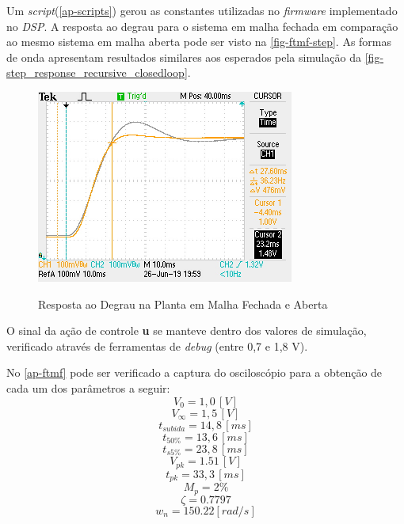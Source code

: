 \documentclass[
	12pt,				%
	article,			%
	openright,			%
	oneside,
	a4paper,			%
	chapter=TITLE,		%
	section=TITLE,		%
	english,			%
	french,				%
	spanish,			%
	brazil,				%
]{abntex2}
\begin{document}
                Um \textit{script}(\autoref{ap-scripts}) gerou as constantes utilizadas no \textit{firmware} implementado no \textit{DSP}. A resposta ao degrau para o sistema em malha fechada em comparação ao mesmo sistema em malha aberta pode ser visto na \autoref{fig-ftmf-step}.
                As formas de onda apresentam resultados similares aos esperados pela simulação da \autoref{fig-step_response_recursive_closedloop}.
                
                \begin{figure}[htbp]
                	\centering
                	\caption{Resposta ao Degrau na Planta em Malha Fechada e Aberta}
                	\includegraphics[width=\textwidth,height=240px,keepaspectratio]{imgs/ftmf/step_response.JPG}
                	\label{fig-ftmf-step}
            	\end{figure}
            	
            	O sinal da ação de controle \textbf{u} se manteve dentro dos valores de simulação, verificado através de ferramentas de \textit{debug} (entre 0,7 e 1,8 V).
            	
            	\FloatBarrier
                No \autoref{ap-ftmf} pode ser verificado a captura do osciloscópio para a obtenção de cada um dos parâmetros a seguir:
                $$V_{0}=1,0\,[V]$$
                $$V_{\infty}=1,5\,[V]$$
                $$t_{subida}=14,8\,[ms]$$
                $$t_{50\%}=13,6\,[ms]$$
                $$t_{s5\%}=23,8\,[ms]$$
                $$V_{pk}=1.51\,[V]$$
                $$t_{pk}=33,3\,[ms]$$
                $$M_{p}=2\%$$
                $$\zeta = 0.7797 $$
                $$w_n = 150.22 [rad/s]$$
                \FloatBarrier
                
\end{document}
